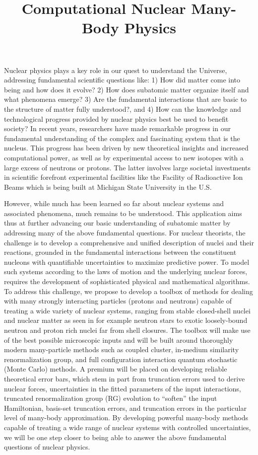 \documentclass[10pt]{article}
\begin{document}
\title{Computational Nuclear Many-Body Physics}
\date{}
\maketitle

Nuclear physics plays a key role in our quest to understand  the
Universe, addressing fundamental scientific questions like: 1) How did matter come
  into being and how does it evolve? 2) How does subatomic
  matter organize itself and what phenomena emerge? 3) Are
  the fundamental interactions that are basic to the structure of
  matter fully understood?, and 4) How can the knowledge and
  technological progress provided by nuclear physics best be used to
  benefit society?  In recent years, researchers
have made remarkable progress in our fundamental understanding of the
complex and fascinating system that is the
nucleus. This progress has been driven
by new theoretical insights and increased computational power, as well
as by experimental access to new isotopes with a large excess of
neutrons or protons.  The latter involves large societal investments in 
scientific forefront experimental facilities like the Facility of Radioactive Ion Beams which is being built at Michigan State University in the U.S.

However, while much has been learned so far
about nuclear systems and associated phenomena, much remains to be
understood.
This application aims thus at further advancing our basic understanding of subatomic matter
by addressing many of the above fundamental questions. For
nuclear theorists, the challenge is to develop a comprehensive and
unified description of nuclei and their reactions, grounded in the
fundamental interactions between the constituent nucleons with
quantifiable uncertainties to maximize predictive power. To model such systems according to the 
laws of motion and the underlying nuclear forces, requires the development of sophisticated 
physical and mathematical algorithms.
To address
this challenge, we propose to develop a toolbox  of methods for 
dealing with many strongly interacting particles 
(protons and neutrons) 
capable of treating a wide variety of nuclear systems, ranging from
stable closed-shell nuclei and nuclear matter as seen in for example neutron stars to exotic
loosely-bound neutron and proton rich nuclei far from shell
closures. The toolbox will make use of the best possible microscopic
inputs and
will be built around thoroughly modern many-particle methods such as
coupled cluster, in-medium similarity renormalization group, and full
configuration interaction quantum stochastic (Monte Carlo) methods.  A premium will
be placed on developing reliable theoretical error bars, which stem in
part from truncation errors used to derive nuclear
forces, uncertainties in the fitted parameters of the input
interactions, truncated renormalization group (RG) evolution to
``soften'' the input Hamiltonian, basis-set truncation errors, and
truncation errors in the particular level of many-body approximation.
By developing powerful many-body methods capable of treating a wide
range of nuclear systems with controlled uncertainties, we will be one
step closer to being able to answer the above fundamental questions of nuclear
physics.
\end{document}
